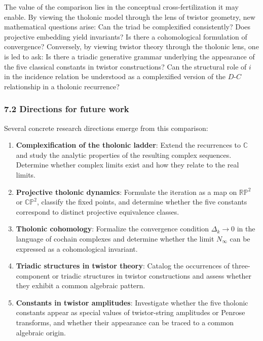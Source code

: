 \documentclass[
  11pt,
  letterpaper,
]{article}
\begin{document}
The value of the comparison lies in the conceptual cross-fertilization
it may enable. By viewing the tholonic model through the lens of twistor
geometry, new mathematical questions arise: Can the triad be
complexified consistently? Does projective embedding yield invariants?
Is there a cohomological formulation of convergence? Conversely, by
viewing twistor theory through the tholonic lens, one is led to ask: Is
there a triadic generative grammar underlying the appearance of the five
classical constants in twistor constructions? Can the structural role of
\(i\) in the incidence relation be understood as a complexified version
of the \(D\)-\(C\) relationship in a tholonic recurrence?

\subsubsection{7.2 Directions for future
work}\label{directions-for-future-work}

Several concrete research directions emerge from this comparison:

\begin{enumerate}
\def\labelenumi{\arabic{enumi}.}
\item
  \textbf{Complexification of the tholonic ladder}: Extend the
  recurrences to \(\mathbb{C}\) and study the analytic properties of the
  resulting complex sequences. Determine whether complex limits exist
  and how they relate to the real limits.
\item
  \textbf{Projective tholonic dynamics}: Formulate the iteration as a
  map on \(\mathbb{RP}^2\) or \(\mathbb{CP}^2\), classify the fixed
  points, and determine whether the five constants correspond to
  distinct projective equivalence classes.
\item
  \textbf{Tholonic cohomology}: Formalize the convergence condition
  \(\Delta_k \to 0\) in the language of cochain complexes and determine
  whether the limit \(N_\infty\) can be expressed as a cohomological
  invariant.
\item
  \textbf{Triadic structures in twistor theory}: Catalog the occurrences
  of three-component or triadic structures in twistor constructions and
  assess whether they exhibit a common algebraic pattern.
\item
  \textbf{Constants in twistor amplitudes}: Investigate whether the five
  tholonic constants appear as special values of twistor-string
  amplitudes or Penrose transforms, and whether their appearance can be
  traced to a common algebraic origin.
\end{enumerate}
\end{document}
